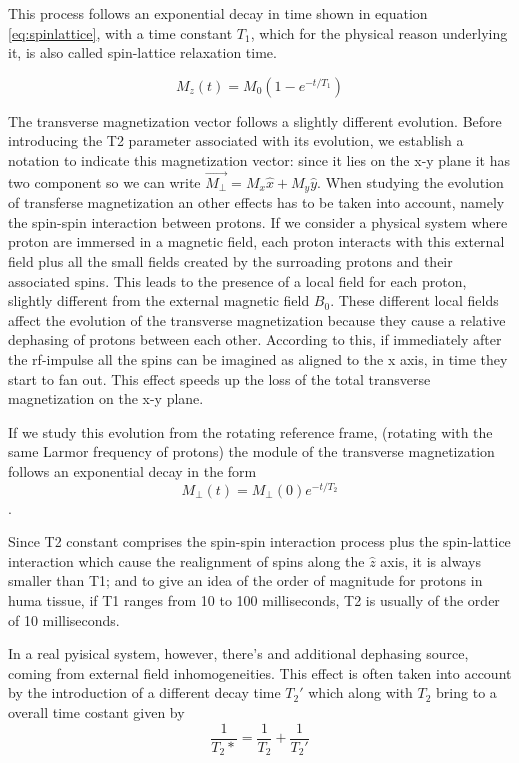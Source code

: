 \documentclass[10pt]{report}
\begin{document}
This process follows an exponential decay in time shown in equation \ref{eq:spinlattice}, with a time constant $T_1$, which for the physical reason underlying it, is also called spin-lattice relaxation time.

\begin{equation}\label{eq:spinlattice}
M_z(t) = M_0 (1-e^{-t/T_1})
\end{equation}


The transverse magnetization vector follows a slightly different evolution. Before introducing the T2 parameter associated with its evolution, we establish a notation to indicate this magnetization vector: since it lies on the x-y plane it has two component so we can write $\overrightarrow{M_\perp} = M_x \hat x + M_y \hat y$.
When studying the evolution of transferse magnetization an other effects has to be taken into account, namely the spin-spin interaction between protons.
If we consider a physical system where proton are immersed in a magnetic field, each proton interacts with this external field plus all the small fields created by the surroading protons and their associated spins. This leads to the presence of a local field for each proton, slightly different from the external magnetic field $B_0$.
These different local fields affect the evolution of the transverse magnetization because they cause a relative dephasing of protons between each other.
According to this, if immediately after the rf-impulse all the spins can be imagined as aligned to the x axis, in time they start to fan out. This effect speeds up the loss of the total transverse magnetization on the x-y plane.

If we study this evolution from the rotating reference frame, (rotating with the same Larmor frequency of protons) the module of the transverse magnetization follows an exponential decay in the form
\begin{equation}
M_\perp(t) = M_\perp(0) e^{-t/T_2}
\end{equation}.

Since T2 constant comprises the spin-spin interaction process plus the spin-lattice interaction which cause the realignment of spins along the $\hat z$ axis, it is always smaller than T1; and to give an idea of the order of magnitude for protons in huma tissue, if T1 ranges from 10 to 100 milliseconds, T2 is usually of the order of 10 milliseconds.


In a real pyisical system, however, there's and additional dephasing source, coming from external field inhomogeneities.
This effect is often taken into account by the introduction of a different decay time $T_2'$ which along with $T_2$ bring to a overall time costant given by
\begin{equation}
\frac{1}{T_2*} = \frac{1}{T_2}+\frac{1}{T_2'}
\end{equation}
\end{document}
